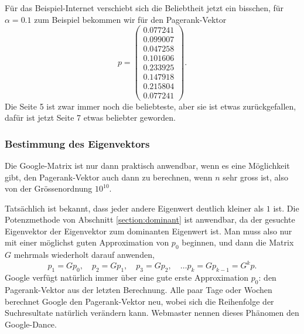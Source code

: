 Für das Beispiel-Internet verschiebt sich die Beliebtheit jetzt ein bisschen,
für $\alpha = 0.1$ zum Beispiel bekommen wir für den Pagerank-Vektor
\[
p=\begin{pmatrix}
   0.077241\\
   0.099007\\
   0.047258\\
   0.101606\\
   0.233925\\
   0.147918\\
   0.215804\\
   0.077241
\end{pmatrix}.
\]
Die Seite 5 ist zwar immer noch die beliebteste, aber sie ist etwas zurückgefallen,
dafür ist jetzt Seite 7 etwas beliebter geworden.

\subsubsection{Bestimmung des Eigenvektors}
Die Google-Matrix ist nur dann praktisch anwendbar, wenn es eine
Möglichkeit gibt, den Pagerank-Vektor auch dann zu berechnen, wenn $n$
sehr gross ist, also von der Grössenordnung $10^{10}$.

Tatsächlich ist bekannt, dass jeder andere Eigenwert deutlich kleiner als $1$
ist.
Die Potenzmethode von Abschnitt \ref{section:dominant} ist anwendbar,
da der gesuchte Eigenvektor der Eigenvektor zum dominanten Eigenwert
ist.
Man muss also nur mit einer möglichst guten Approximation von $p_0$ beginnen,
und dann die Matrix $G$ mehrmals wiederholt darauf anwenden, 
\[
p_1=Gp_0,\quad
p_2=Gp_1,\quad
p_3=Gp_2,\quad\dots p_k=Gp_{k-1}=G^kp.
\]
Google verfügt natürlich immer über eine gute erste Approximation $p_0$:
den Pagerank-Vektor aus der letzten Berechnung.
Alle paar Tage oder Wochen berechnet Google den Pagerank-Vektor neu,
wobei sich die Reihenfolge der Suchresultate natürlich verändern
kann. Webmaster nennen dieses Phänomen den Google-Dance. 

